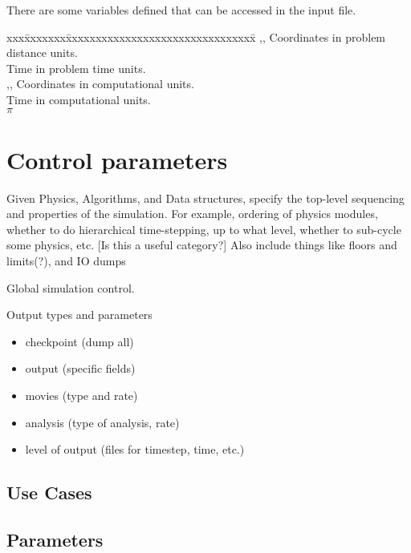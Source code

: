 \documentclass{book}
\begin{document}
There are some variables defined that can be accessed in the input file.
\begin{tabbing}
xxx\=xxxxxxx\=xxxxxxxxxxxxxxxxxxxxxxxxxxxxxxxx\=\kill
\> ,, \> Coordinates in problem distance units. \\
\>  \> Time in problem time units. \\
\> ,, \> Coordinates in computational units. \\
\>  \> Time in computational units. \\
\>  \> $\pi$ \\
\end{tabbing}

\section{Control parameters} \label{s:control}

Given Physics, Algorithms, and Data structures, specify the top-level
sequencing and properties of the simulation.  For example, ordering of
physics modules, whether to do hierarchical time-stepping, up to what
level, whether to sub-cycle some physics, etc. [Is this a useful
category?]  Also include things like floors and limits(?), and IO
dumps

Global simulation control.

Output types and parameters

\begin{itemize}
\item checkpoint (dump all)
\item output (specific fields)
\item movies (type and rate)
\item analysis (type of analysis, rate)
\item level of output (files for timestep, time, etc.)
\end{itemize}

\subsection{Use Cases}
\subsection{Parameters}
\end{document}
